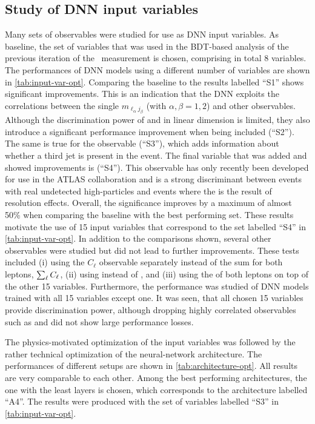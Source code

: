 \subsection{Study of DNN input variables}
Many sets of observables were studied for use as DNN input variables.
As baseline, the set of variables that was used in the BDT-based analysis of the previous iteration of the \HWW\ measurement \cite{HIGG-2016-07} is chosen, comprising in total 8 variables.
The performances of DNN models using a different number of variables are shown in \cref{tab:input-var-opt}.
Comparing the baseline to the results labelled ``S1'' shows significant improvements. This is an indication that the DNN exploits the correlations between the single $m_{\ell_\alpha j_\beta}$ (with $\alpha, \beta = 1, 2$) and other observables.
Although the discrimination power of \pTjone and \pTjtwo in linear dimension is limited, they also introduce a significant performance improvement when being included (``S2''). The same is true for the \pTjthree observable (``S3''), which adds information about whether a third jet is present in the event.
The final variable that was added and showed improvements is \METSig (``S4''). This observable has only recently been developed for use in the ATLAS collaboration \cite{ATLAS-CONF-2018-038} and is a strong discriminant between events with real undetected high-\pT particles and events where the \MET is the result of resolution effects.
Overall, the significance \ZVBF improves by a maximum of almost 50\% when comparing the baseline with the best performing set.
These results motivate the use of 15 input variables that correspond to the set labelled ``S4'' in \cref{tab:input-var-opt}.
In addition to the comparisons shown, several other observables were studied but did not lead to further improvements.
These tests included (i) using the $C_\ell$ observable separately instead of the sum for both leptons, $\sum_\ell C_\ell$, (ii) using \MET instead of \METSig, and (iii) using the \pT of both leptons on top of the other 15 variables.
Furthermore, the performance was studied of DNN models trained with all 15 variables except one. It was seen, that all chosen 15 variables provide discrimination power, although dropping highly correlated observables such as \mjj and \dyjj did not show large performance losses.

The physics-motivated optimization of the input variables was followed by the rather technical optimization of the neural-network architecture.
The performances of different setups are shown in \cref{tab:architecture-opt}. All results are very comparable to each other. Among the best performing architectures, the one with the least layers is chosen, which corresponds to the architecture labelled ``A4''. The results were produced with the set of variables labelled ``S3'' in \cref{tab:input-var-opt}.

